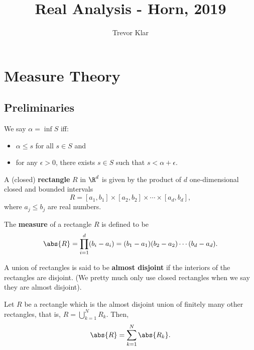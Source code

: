 \documentclass[a5paper, oneside]{book}
\title{Real Analysis - Horn, 2019}
\author{Trevor Klar}
\numberwithin{theorem}{chapter}
\begin{document}
\frontmatter
\maketitle
\tableofcontents

\mainmatter
\chapter{Measure Theory}
\section{Preliminaries}

\begin{highlight}
\begin{definition*}
We say $\alpha=\inf S$ iff:
\begin{itemize}
	\item $\alpha\leq s$ for all $s\in S$ and 
	\item for any $\epsilon>0$, there exists $ s\in S$ such that $s<\alpha+\epsilon$. 
\end{itemize}
\end{definition*}
\end{highlight}

\begin{definition*}
A (closed) \textbf{rectangle} $R$ in $\R^d$ is given by the product of $d$ one-dimensional closed and bounded intervals
$$R = [a_1 , b_1 ] \times [a_2 , b_2 ] \times \cdots \times [a_d , b_d ],$$
where $a_j\leq b_j$ are real numbers. 
\end{definition*}

\begin{highlight}
\begin{definition*}
The \textbf{measure} of a rectangle $R$ is defined to be 
$$\abs{R}=\prod_{i=1}^d(b_i-a_i)=(b_1-a_1)(b_2-a_2)\cdots(b_d-a_d).$$
\end{definition*}
\end{highlight}

\begin{definition*}
A union of rectangles is said to be \textbf{almost disjoint} if the interiors of the rectangles are disjoint. (We pretty much only use closed rectangles when we say they are almost disjoint). 
\end{definition*}

\begin{lemma}
Let $R$ be a rectangle which is the almost disjoint union of finitely many other rectangles, that is, $R=\bigcup\limits_{k=1}^N R_k$. Then, 
$$\abs{R}=\sum_{k=1}^N \abs{R_k}.$$
\end{lemma}
\end{document}
